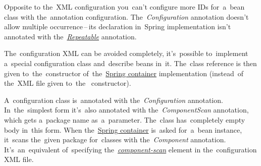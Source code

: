 \warning Opposite to the~XML configuration you~can't configure more IDs for~a~bean class with the~annotation configuration. The~\textit{Configuration} annotation doesn't allow multiple occurrence\,--\,its declaration in~Spring implementation isn't annotated with the~\hyperref[annotationsrepeatable]{\textit{Repeatable}} annotation.
\newpage

\label{iocnoxml}
The~configuration XML can be avoided completely, it's~possible to~implement a~special configuration class and~describe beans in~it. The~class reference is then given to~the~constructor of~the~\hyperref[springcontainrer]{Spring container} implementation  (instead~of the~XML file given to~the~ constructor).

A~configuration class is~annotated with the~\textit{Configuration} annotation. In~the~simplest form it's~also annotated with the~\textit{ComponentScan} annotation, which gets a~package name as~a~parameter. The~class has~completely empty body in~this form. When the~\hyperref[springcontainrer]{Spring container} is~asked for~a~bean instance, it~scans the~given package for~classes with the~\textit{Component} annotation. It's~an~equivalent of~specifying the~\hyperref[iocannotations]{\textit{component-scan}} element in the~configuration XML file.\\

